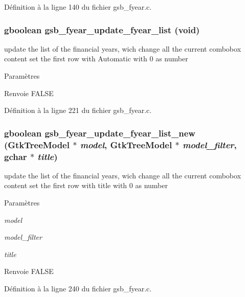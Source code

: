 Définition à la ligne 140 du fichier gsb\_\-fyear.c.

\subsubsection[{gsb\_\-fyear\_\-update\_\-fyear\_\-list}]{\setlength{\rightskip}{0pt plus 5cm}gboolean gsb\_\-fyear\_\-update\_\-fyear\_\-list (void)}\label{gsb__fyear_8c_a1f37b63b2e43be7ebddf47e5f4b6ddb3}
update the list of the financial years, wich change all the current combobox content set the first row with Automatic with 0 as number


\begin{DoxyParams}{Paramètres}
\item[{\em }]\end{DoxyParams}
\begin{DoxyReturn}{Renvoie}
FALSE 
\end{DoxyReturn}


Définition à la ligne 221 du fichier gsb\_\-fyear.c.

\subsubsection[{gsb\_\-fyear\_\-update\_\-fyear\_\-list\_\-new}]{\setlength{\rightskip}{0pt plus 5cm}gboolean gsb\_\-fyear\_\-update\_\-fyear\_\-list\_\-new (GtkTreeModel $\ast$ {\em model}, \/  GtkTreeModel $\ast$ {\em model\_\-filter}, \/  gchar $\ast$ {\em title})}\label{gsb__fyear_8c_a34d75e7b50bee69ad545dcea4df88f9a}
update the list of the financial years, wich change all the current combobox content set the first row with title with 0 as number


\begin{DoxyParams}{Paramètres}
\item[{\em model}]\item[{\em model\_\-filter}]\item[{\em title}]\end{DoxyParams}
\begin{DoxyReturn}{Renvoie}
FALSE 
\end{DoxyReturn}


Définition à la ligne 240 du fichier gsb\_\-fyear.c.

